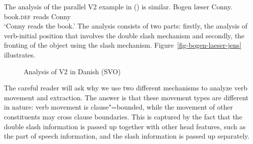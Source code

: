 \largerpage
The analysis of the parallel  V2 example in () is similar. 
\ea
\gll Bogen             læser Conny.\\
     book.\textsc{def} reads Conny\\
\glt `Conny reads the book.'
\z
The analysis consists of two parts: firstly, the analysis of verb-initial position that involves the
double slash mechanism and secondly, the fronting of the object using the slash
mechanism. Figure~\vref{fig-bogen-laeser-jens} illustrates.
\begin{figure}
\scalebox{.95}{%
\begin{forest}
sm edges
[S
   [NP$_i$ [bogen;book.\textsc{def}] ]
      [S/NP
         [V \sliste{ S//V }
           [V [læser$_j$;reads] ] ]
           [S//\vSLASHnp
             [NP [Conny;Conny] ]
             [VP//\vSLASHnp
               [V//V  [\_$_j$] ]
               [NP/NP [\trace$_i$ ] ] ] ] ] ] ] 
\end{forest}}
\caption{\label{fig-bogen-laeser-jens}Analysis of V2 in Danish (SVO)}
\end{figure}

The careful reader will ask why we use two different mechanisms to analyze verb movement and
extraction. The answer is that these movement types are different in nature: verb movement is
clause"=bounded, while the movement of other constituents may cross clause boundaries. This is captured by the
fact that the double slash information is passed up together with other head features, such as the
part of speech information, and the slash information is passed up separately. 

